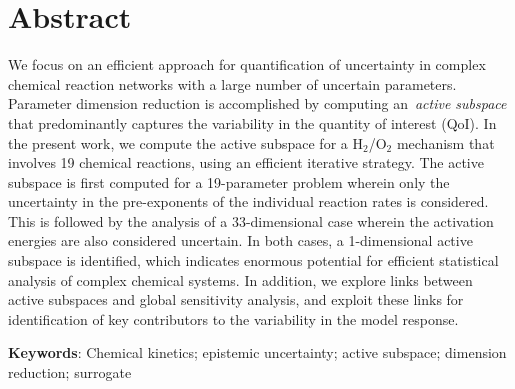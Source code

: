 \section*{Abstract}
We focus on an efficient approach for quantification of uncertainty in complex chemical
reaction networks with a large number of uncertain parameters.  Parameter
dimension reduction is accomplished by computing an~\emph{active subspace} that
predominantly captures the variability in the quantity of interest (QoI).  In
the present work, we compute the active subspace for a H$_2$/O$_2$ mechanism 
that involves 19 chemical reactions, using an efficient iterative strategy.  The
active subspace is first computed for a 19-parameter problem wherein only the
uncertainty in the pre-exponents of the individual reaction rates is
considered. This is followed by the analysis of a 33-dimensional case wherein
the activation energies are also considered uncertain.  In both cases, a
1-dimensional active subspace is identified, which indicates enormous
potential for efficient statistical analysis of complex chemical systems. In
addition, we explore links between active subspaces and global sensitivity
analysis, and exploit these links for identification of key
contributors to the variability in the model response.
\bigskip

\noindent \textbf{Keywords}: Chemical kinetics; epistemic uncertainty; active subspace; dimension reduction; surrogate
